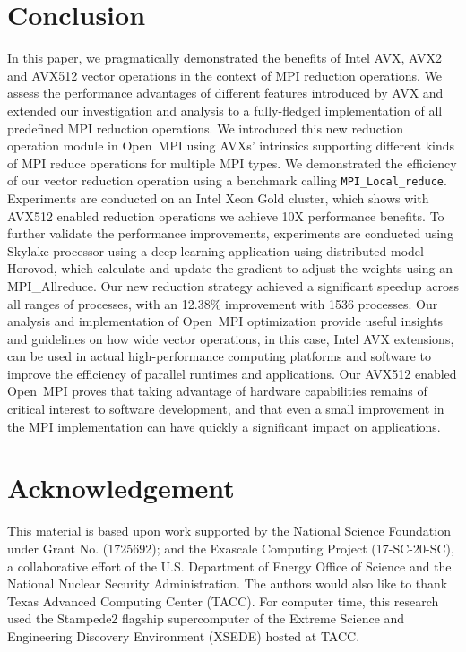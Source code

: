 \documentclass[sigconf]{acmart}
\newcommand{\mpifunc}[1]{\lstinline"MPI_#1"\xspace}
\newcommand{\ompi}[0]{Open~MPI\xspace}
\newcommand{\mpi}[0]{\textsc{MPI}\xspace}
\begin{document}
\section{Conclusion}\label{sec:conclusion}
In this paper, we pragmatically demonstrated the benefits of Intel
AVX, AVX2 and AVX512 vector operations in the context of MPI reduction
operations. We assess the performance advantages of different features
introduced by AVX and extended our investigation and analysis to a
fully-fledged implementation of all predefined MPI reduction
operations.
%
We introduced this new reduction operation module in \ompi using AVXs'
intrinsics supporting different kinds of \mpi reduce operations for
multiple \mpi types. We demonstrated the efficiency of our vector
reduction operation using a benchmark calling
\mpifunc{Local_reduce}. Experiments are conducted on an Intel Xeon
Gold cluster, which shows with AVX512 enabled reduction operations we
achieve 10X performance benefits.
%
To further validate the performance improvements, experiments are
conducted using Skylake processor using a deep learning application
using distributed model Horovod, which calculate and update the
gradient to adjust the weights using an MPI\_Allreduce.  Our new
reduction strategy achieved a significant speedup across all ranges of
processes, with an 12.38\% improvement with 1536 processes.  Our
analysis and implementation of \ompi optimization provide useful
insights and guidelines on how wide vector operations, in this case,
Intel AVX extensions, can be used in actual high-performance computing
platforms and software to improve the efficiency of parallel runtimes
and applications.
%
Our AVX512 enabled \ompi proves that taking advantage of hardware
capabilities remains of critical interest to software development, and
that even a small improvement in the MPI implementation can have
quickly a significant impact on applications.

\section*{Acknowledgement}
%
This material is based upon work supported by the National Science Foundation under Grant No. (1725692); and the Exascale Computing Project (17-SC-20-SC), a collaborative effort of the
U.S. Department of Energy Office of Science and the National Nuclear Security Administration.
The authors would also like to thank
Texas Advanced Computing Center (TACC). For computer time, this research used
the Stampede2 flagship supercomputer of the Extreme Science and Engineering Discovery Environment (XSEDE) hosted at TACC.
%
%


\end{document}
